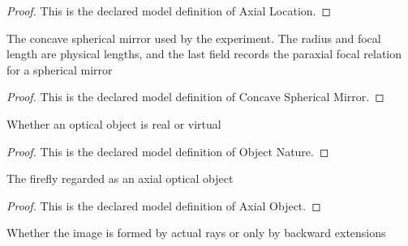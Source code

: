 \begin{proof}
  This is the declared model definition of Axial Location.
\end{proof}
\begin{definition}
  \label{def:physics:phyx-mini-0113:phyxminiproblems-problemphyxmini0113-concavesphericalmirror}
  The concave spherical mirror used by the experiment. The radius and focal length are physical lengths, and the last field records the paraxial focal relation for a spherical mirror
\end{definition}
\begin{proof}
  This is the declared model definition of Concave Spherical Mirror.
\end{proof}
\begin{definition}
  \label{def:physics:phyx-mini-0113:phyxminiproblems-problemphyxmini0113-objectnature}
  Whether an optical object is real or virtual
\end{definition}
\begin{proof}
  This is the declared model definition of Object Nature.
\end{proof}
\begin{definition}
  \label{def:physics:phyx-mini-0113:phyxminiproblems-problemphyxmini0113-axialobject}
  The firefly regarded as an axial optical object
\end{definition}
\begin{proof}
  This is the declared model definition of Axial Object.
\end{proof}
\begin{definition}
  \label{def:physics:phyx-mini-0113:phyxminiproblems-problemphyxmini0113-imagenature}
  Whether the image is formed by actual rays or only by backward extensions
\end{definition}
